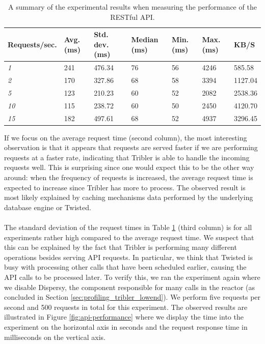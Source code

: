 \begin{table}[]
	\centering
	\begin{tabular}{|l|l|l|l|l|l|l|}
		\hline
		\textbf{Requests/sec.} & \textbf{Avg. (ms)} & \textbf{Std. dev. (ms)} & \textbf{Median (ms)} & \textbf{Min. (ms)} & \textbf{Max. (ms)} & \textbf{KB/S} \\ \hline
		\emph{1} & 241 & 476.34 & 76 & 56 & 4246 & 585.58\\ \hline
		\emph{2} & 170 & 327.86 & 68 & 58 & 3394 & 1127.04\\ \hline
		\emph{5} & 123 & 210.23 & 60 & 52 & 2082 & 2538.36\\ \hline
		\emph{10} & 115 & 238.72 & 60 & 50 & 2450 & 4120.70\\ \hline
		\emph{15} & 182 & 497.61 & 68 & 52 & 4937 & 3296.45\\ \hline
	\end{tabular}
	\caption{A summary of the experimental results when measuring the performance of the RESTful API.}
	\label{table:performance-api-results}
\end{table}

If we focus on the average request time (second column), the most interesting observation is that it appears that requests are served faster if we are performing requests at a faster rate, indicating that Tribler is able to handle the incoming requests well. This is surprising since one would expect this to be the other way around: when the frequency of requests is increased, the average request time is expected to increase since Tribler has more to process. The observed result is most likely explained by caching mechanisms data performed by the underlying database engine or Twisted.\\\\
The standard deviation of the request times in Table \ref{table:performance-api-results} (third column) is for all experiments rather high compared to the average request time. We suspect that this can be explained by the fact that Tribler is performing many different operations besides serving API requests. In particular, we think that Twisted is busy with processing other calls that have been scheduled earlier, causing the API calls to be processed later. To verify this, we ran the experiment again where we disable Dispersy, the component responsible for many calls in the reactor (as concluded in Section \ref{sec:profiling_tribler_lowend}). We perform five requests per second and 500 requests in total for this experiment. The observed results are illustrated in Figure \ref{fig:api-performance} where we display the time into the experiment on the horizontal axis in seconds and the request response time in milliseconds on the vertical axis.\\

